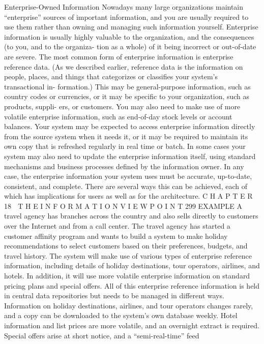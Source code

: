 Enterprise-Owned Information
Nowadays many large organizations maintain “enterprise” sources of important
information, and you are usually required to use them rather than owning and
managing such information yourself. Enterprise information is usually highly
valuable to the organization, and the consequences (to you, and to the organiza-
tion as a whole) of it being incorrect or out-of-date are severe.
The most common form of enterprise information is enterprise reference
data. (As we described earlier, reference data is the information on people,
places, and things that categorizes or classifies your system’s transactional in-
formation.) This may be general-purpose information, such as country codes or
currencies, or it may be specific to your organization, such as products, suppli-
ers, or customers. You may also need to make use of more volatile enterprise
information, such as end-of-day stock levels or account balances.
Your system may be expected to access enterprise information directly
from the source system when it needs it, or it may be required to maintain
its own copy that is refreshed regularly in real time or batch. In some cases
your system may also need to update the enterprise information itself, using
standard mechanisms and business processes defined by the information
owner.
In any case, the enterprise information your system uses must be
accurate, up-to-date, consistent, and complete. There are several ways this
can be achieved, each of which has implications for users as well as for the
architecture.
C H A P T E R 18  T H E I N F O R M A T I O N V I E W P O I N T
 299
EXAMPLE A travel agency has branches across the country and also
sells directly to customers over the Internet and from a call center. The
travel agency has started a customer affinity program and wants to
build a system to make holiday recommendations to select customers
based on their preferences, budgets, and travel history. The system will
make use of various types of enterprise reference information, including
details of holiday destinations, tour operators, airlines, and hotels. In
addition, it will use more volatile enterprise information on standard
pricing plans and special offers.
All of this enterprise reference information is held in central data
repositories but needs to be managed in different ways. Information on
holiday destinations, airlines, and tour operators changes rarely, and a
copy can be downloaded to the system’s own database weekly. Hotel
information and list prices are more volatile, and an overnight extract is
required. Special offers arise at short notice, and a “semi-real-time” feed
